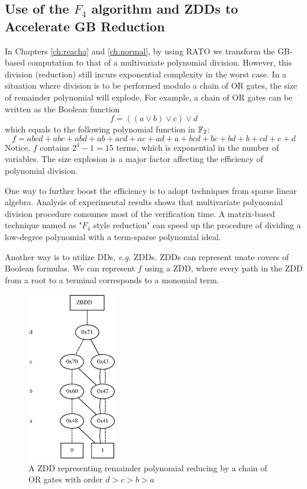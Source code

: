 \subsection{Use of the $F_4$ algorithm and ZDDs to Accelerate GB Reduction}
In Chapters \ref{ch:reacha} and \ref{ch:normal}, by using RATO we transform the GB-based
computation to that of a multivariate polynomial division. However, this division (reduction)
still incurs exponential complexity in the worst case. In a situation where division is to be performed modulo
a chain of OR gates, the size of remainder polynomial will explode. For example, a chain of OR gates 
can be written as the Boolean function 
\begin{equation}
\label{eqn:chainOR}
f = ((a\lor b) \lor c) \lor d
\end{equation}
which equals to the following polynomial function in ${\mathbb{F}}_2$:
$$f = abcd+abc+abd+ab+acd+ac+ad+a+bcd+bc+bd+b+cd+c+d$$
Notice, $f$ contains $2^4-1 = 15$ terms, which is exponential in the number of variables.
The size explosion is a major factor affecting the efficiency of polynomial division.

One way to further boost the efficiency is to adopt techniques from sparse linear algebra.
Analysis of experimental results shows that multivariate polynomial division procedure
consumes most of the verification time.
A matrix-based technique named as "$F_4$ style reduction" \cite{f4} can speed up the procedure of
dividing a low-degree polynomial with a term-sparse polynomial ideal. 

Another way is to utilize DDs, {\it e.g.} ZDDs. ZDDs can represent unate covers of Boolean formulas.
We can represent $f$ using a ZDD, where every path in the ZDD from a root to a terminal corresponds
to a monomial term.

\begin{figure}[h]
\centerline{
\includegraphics[width=0.35\textwidth]{newfig/ZDD.eps}
}
\caption{A ZDD representing remainder polynomial reducing by a chain of OR gates with order $d>c>b>a$}
\label{fig:ZDD}
\end{figure}

